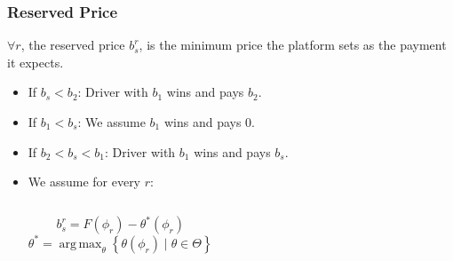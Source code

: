 \documentclass[t]{beamer}
\DeclareMathOperator*{\argmax}{arg\,max}
\begin{document}
\begin{frame}\frametitle{Reserved Price}
\begin{block}{}
$\forall r$, the reserved price $b_s^r$, is the minimum price the platform sets as the payment it expects. 
\end{block}
\begin{itemize}
\item<2-> If $b_s < b_2$: Driver with $b_1$ wins and pays $b_2$.
\item<3-> If $b_1 < b_s$: We assume $b_1$ wins and pays 0.
\item<4-> If $b_2 < b_s < b_1$: Driver with $b_1$ wins and pays $b_s$.
\end{itemize}
\begin{itemize}
\item<5-> We assume for every $r$:
\begin{columns}
\begin{equation*}
b_s^r = F(\phi_r) - \theta^*(\phi_r)
\end{equation*}
\vspace{-0.15in}
\begin{equation*}
\theta^* = \argmax_\theta \left\lbrace \theta(\phi_r) \mid \theta \in \Theta \right\rbrace 
\end{equation*}
\end{columns}
\end{itemize}
\end{frame}
\end{document}
